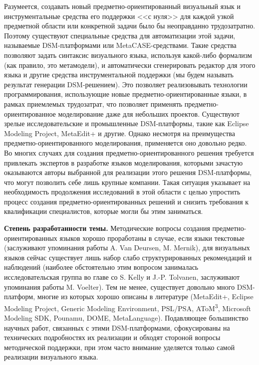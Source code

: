 Разумеется, создавать новый предметно-ориентированный визуальный язык и 
инструментальные средства его поддержки <<с нуля>> для каждой узкой предметной 
области или конкретной задачи было бы неоправданно трудозатратно. Поэтому 
существуют специальные средства для автоматизации этой задачи, называемые 
DSM-платформами или MetaCASE-средствами. Такие средства позволяют задать 
синтаксис визуального языка, используя какой-либо формализм (как правило, 
это метамодели), и автоматически сгенерировать редактор для этого языка и другие средства инструментальной 
поддержки (мы будем называть результат генерации DSM-решением). 
Это позволяет реализовывать технологии программирования, использующие новые предметно-ориентированные языки, в рамках приемлемых трудозатрат, 
что позволяет применять предметно-ориентированное моделирование даже для небольших проектов. Существуют зрелые исследовательские и промышленные 
DSM-платформы, такие как Eclipse Modeling Project, MetaEdit+ и другие. Однако 
несмотря на преимущества предметно-ориентированного моделирования, применяется оно 
довольно редко. Во многих случаях для создания предметно-ориентированного 
решения требуется привлекать экспертов в разработке языков моделирования, которыми зачастую 
оказываются авторы выбранной для реализации этого решения DSM-платформы, что могут
позволить себе лишь крупные компании. Такая ситуация указывает на 
необходимость продолжения исследований в этой области с целью упростить процесс создания
предметно-ориентированных решений и снизить требования к квалификации специалистов, 
которые могли бы этим заниматься.

\textbf{Степень разработанности темы.}
Методические вопросы создания предметно-ориентированных языков хорошо проработаны в случае, если 
языки текстовые (заслуживают упоминания работы A. Van Deursen, M. Mernik), для визуальных
языков сейчас существует лишь набор слабо структурированных рекомендаций и наблюдений
(наиболее обстоятельно этим вопросом занималась исследовательская группа во главе 
со S. Kelly и J.-P. Tolvanen, заслуживают упоминания работы M. Voelter). Тем не менее, 
существует довольно много DSM-платформ, многие из которых хорошо описаны в литературе 
(MetaEdit+, Eclipse Modeling Project, Generic Modeling Environment, PSL/PSA, AToM\textsuperscript{3},
Microsoft Modeling SDK, Pounamu, DOME, MetaLanguage). Подавляющее большинство 
научных работ, связанных с этими DSM-платформами, сфокусированы на технических подробностях
их реализации и обходят стороной вопросы методической поддержки, при этом часто внимание 
уделяется только самой реализации визуального языка.

